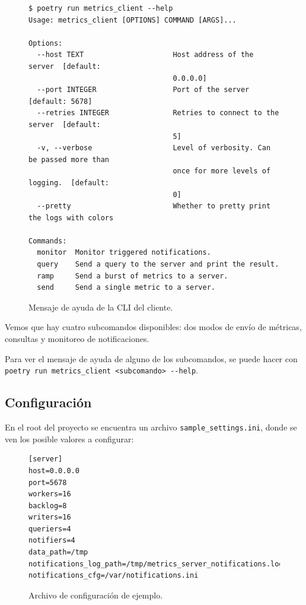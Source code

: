 \documentclass[a4paper,oneside]{article}
\begin{document}
\begin{figure}[H]
\begin{verbatim}
$ poetry run metrics_client --help
Usage: metrics_client [OPTIONS] COMMAND [ARGS]...

Options:
  --host TEXT                     Host address of the server  [default:
                                  0.0.0.0]
  --port INTEGER                  Port of the server  [default: 5678]
  --retries INTEGER               Retries to connect to the server  [default:
                                  5]
  -v, --verbose                   Level of verbosity. Can be passed more than
                                  once for more levels of logging.  [default:
                                  0]
  --pretty                        Whether to pretty print the logs with colors

Commands:
  monitor  Monitor triggered notifications.
  query    Send a query to the server and print the result.
  ramp     Send a burst of metrics to a server.
  send     Send a single metric to a server.
\end{verbatim}
\caption{Mensaje de ayuda de la CLI del cliente.}
\end{figure}

Vemos que hay cuatro subcomandos disponibles: dos modos de envío de métricas, consultas y monitoreo de notificaciones.

Para ver el mensaje de ayuda de alguno de los subcomandos, se puede hacer con \texttt{poetry run metrics\_client <subcomando> \--\--help}.

\subsection{Configuración} \label{configuracion}
En el root del proyecto se encuentra un archivo \texttt{sample\_settings.ini}, donde se ven los posible valores a configurar:

\begin{figure}[H]
\begin{verbatim}
[server]
host=0.0.0.0
port=5678
workers=16
backlog=8
writers=16
queriers=4
notifiers=4
data_path=/tmp
notifications_log_path=/tmp/metrics_server_notifications.log
notifications_cfg=/var/notifications.ini
\end{verbatim}
\caption{Archivo de configuración de ejemplo.}
\end{figure}
\end{document}
